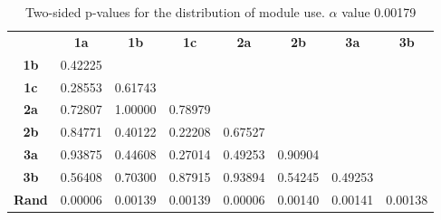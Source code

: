 \begin{table}[h!]
    \centering
    \begin{tabular}{cccccccc}
                  & \textbf{1a}  & \textbf{1b}  & \textbf{1c}  & \textbf{2a}  & \textbf{2b}  & \textbf{3a}  & \textbf{3b}  \\
    \textbf{1b}   & 0.42225 &         &         &         &         &         &              \\
    \textbf{1c}   & 0.28553 & 0.61743 &         &         &         &         &              \\
    \textbf{2a}   & 0.72807 & 1.00000 & 0.78979 &         &         &         &              \\
    \textbf{2b}   & 0.84771 & 0.40122 & 0.22208 & 0.67527 &         &         &              \\
    \textbf{3a}   & 0.93875 & 0.44608 & 0.27014 & 0.49253 & 0.90904 &         &              \\
    \textbf{3b}   & 0.56408 & 0.70300 & 0.87915 & 0.93894 & 0.54245 & 0.49253 &              \\
    \textbf{Rand} & 0.00006 & 0.00139 & 0.00139 & 0.00006 & 0.00140 & 0.00141 & 0.00138
    \end{tabular}
    \caption[Experiment 2: p-table for capacity use]{Two-sided p-values for the distribution of module use. \(\alpha\) value 0.00179}
    \label{tab:exp2.capacityptable}
\end{table}
